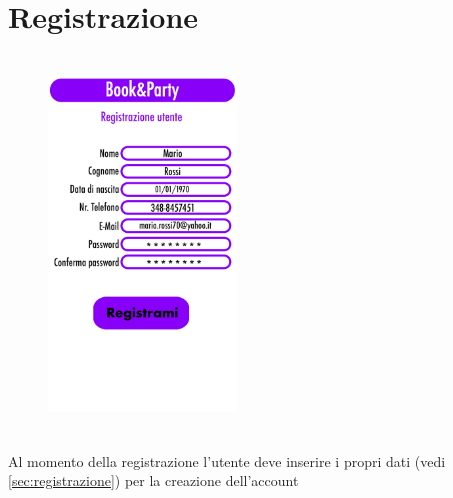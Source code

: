 \section{Registrazione}
\begin{figure}[h]
    \centering
    \includegraphics[width=5cm, height=10cm]{mockup/02-registrazione.jpg}
    \label{fig:registra}
\end{figure}

Al momento della registrazione l'utente deve inserire i propri dati (vedi 
\ref{sec:registrazione}) per la creazione dell'account

\newpage
